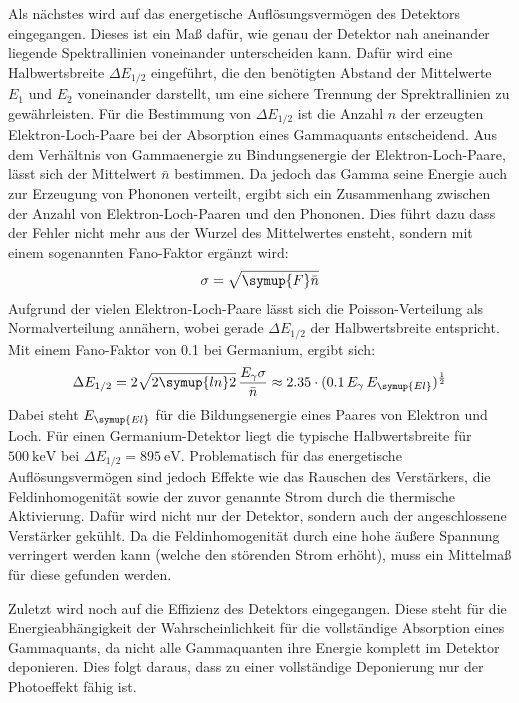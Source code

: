     Als nächstes wird auf das energetische Auflösungsvermögen des Detektors eingegangen.
    Dieses ist ein Maß dafür, wie genau der Detektor nah aneinander liegende Spektrallinien
    voneinander unterscheiden kann. Dafür wird eine Halbwertsbreite $\Delta E_{1/2}$ eingeführt, die den benötigten Abstand
    der Mittelwerte $E_1$ und $E_2$ voneinander darstellt, um eine sichere Trennung der Sprektrallinien zu gewährleisten.
    Für die Bestimmung von $\Delta E_{1/2}$ ist die Anzahl $n$ der erzeugten Elektron-Loch-Paare bei der Absorption eines
    Gammaquants entscheidend. Aus dem Verhältnis von Gammaenergie zu Bindungsenergie der Elektron-Loch-Paare, lässt sich
    der Mittelwert $\bar{n}$ bestimmen. Da jedoch das Gamma seine Energie auch zur Erzeugung von Phononen verteilt, ergibt sich
    ein Zusammenhang zwischen der Anzahl von Elektron-Loch-Paaren und den Phononen. Dies führt dazu dass der Fehler nicht mehr aus der Wurzel des
    Mittelwertes ensteht, sondern mit einem sogenannten Fano-Faktor ergänzt wird:
    \begin{align}
      \sigma = \sqrt{\symup{F}\bar{n}}
    \end{align}
    Aufgrund der vielen Elektron-Loch-Paare lässt sich die Poisson-Verteilung als
    Normalverteilung annähern, wobei gerade $\Delta E_{1/2}$ der Halbwertsbreite entspricht.
    Mit einem Fano-Faktor von 0.1 bei Germanium, ergibt sich:
    \begin{align}
      \Delta E_{1/2} = 2\sqrt{2\symup{ln}2}\,\frac{E_{\gamma}\sigma}{\bar{n}} \approx 2.35\cdot(0.1\,E_\gamma\,E_{\symup{El}})^{\frac{1}{2}}
      \label{eqn:auflsg}
    \end{align}
    Dabei steht $E_{\symup{El}}$ für die Bildungsenergie eines Paares von Elektron und Loch.
    Für einen Germanium-Detektor liegt die typische Halbwertsbreite für $\SI{500}{\kilo\electronvolt}$ bei
    $\Delta E_{1/2} =\SI{895}{\electronvolt}$.
    Problematisch für das energetische Auflösungsvermögen sind jedoch Effekte wie das Rauschen
    des Verstärkers, die Feldinhomogenität sowie der zuvor genannte
    Strom durch die thermische Aktivierung.
    Dafür wird nicht nur der Detektor, sondern auch der
    angeschlossene Verstärker gekühlt. Da die Feldinhomogenität durch eine hohe
    äußere Spannung verringert werden kann (welche den störenden Strom erhöht), muss ein Mittelmaß
    für diese gefunden werden.

    Zuletzt wird noch auf die Effizienz des Detektors eingegangen.
    Diese steht für die Energieabhängigkeit der Wahrscheinlichkeit für die vollständige Absorption
    eines Gammaquants, da nicht alle Gammaquanten ihre Energie komplett im Detektor deponieren.
    Dies folgt daraus, dass zu einer vollständige Deponierung nur der Photoeffekt fähig ist.

